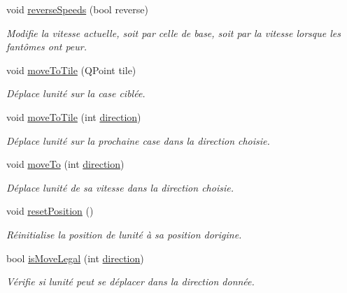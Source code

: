 \begin{DoxyCompactItemize}
void \hyperlink{class_unit_a7b265c0e213164ee5446e6930c0a2155}{reverse\+Speeds} (bool reverse)
\begin{DoxyCompactList}\small\item\em Modifie la vitesse actuelle, soit par celle de base, soit par la vitesse lorsque les fantômes ont peur. \end{DoxyCompactList}\item 
void \hyperlink{class_unit_a3c457eefcea6d9c0e6f07303d4b2f73c}{move\+To\+Tile} (Q\+Point tile)
\begin{DoxyCompactList}\small\item\em Déplace l\textquotesingle{}unité sur la case ciblée. \end{DoxyCompactList}\item 
void \hyperlink{class_unit_ad7e1e0f92908be580fbf75a83fd85467}{move\+To\+Tile} (int \hyperlink{class_unit_a5d8a5a789acfa4d2502b0c1082876172}{direction})
\begin{DoxyCompactList}\small\item\em Déplace l\textquotesingle{}unité sur la prochaine case dans la direction choisie. \end{DoxyCompactList}\item 
void \hyperlink{class_unit_a3ac85960189eb629b56e00ec231b87fa}{move\+To} (int \hyperlink{class_unit_a5d8a5a789acfa4d2502b0c1082876172}{direction})
\begin{DoxyCompactList}\small\item\em Déplace l\textquotesingle{}unité de sa vitesse dans la direction choisie. \end{DoxyCompactList}\item 
void \hyperlink{class_unit_aae1ddaef885741c7b5fc6f1eefd46907}{reset\+Position} ()
\begin{DoxyCompactList}\small\item\em Réinitialise la position de l\textquotesingle{}unité à sa position d\textquotesingle{}origine. \end{DoxyCompactList}\item 
bool \hyperlink{class_unit_a9f26369cc967f76ef91daee0927669aa}{is\+Move\+Legal} (int \hyperlink{class_unit_a5d8a5a789acfa4d2502b0c1082876172}{direction})
\begin{DoxyCompactList}\small\item\em Vérifie si l\textquotesingle{}unité peut se déplacer dans la direction donnée. \end{DoxyCompactList}\end{DoxyCompactItemize}
